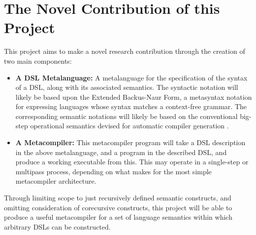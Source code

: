 \section{The Novel Contribution of this Project} %
\label{sec:the_novel_contribution_of_this_project}
This project aims to make a novel research contribution through the creation of two main components:
\begin{itemize}
    \item \textbf{A DSL Metalanguage:} A metalanguage for the specification of the syntax of a DSL, along with its associated semantics. 
    The syntactic notation will likely be based upon the Extended Backus-Naur Form, a metasyntax notation for expressing languages whose syntax matches a context-free grammar. 
    The corresponding semantic notations will likely be based on the conventional big-step operational semantics \citep{Schmidt:2003:PLS:1074100.1074733} devised for automatic compiler generation \citep{diehl1996semantics}.
    \item \textbf{A Metacompiler:} This metacompiler program will take a DSL description in the above metalanguage, and a program in the described DSL, and produce a working executable from this. 
    This may operate in a single-step or multipass process, depending on what makes for the most simple metacompiler architecture.
\end{itemize}

Through limiting scope to just recursively defined semantic constructs, and omitting consideration of corecursive constructs, this project will be able to produce a useful metacompiler for a set of language semantics within which arbitrary DSLs can be constructed. 


